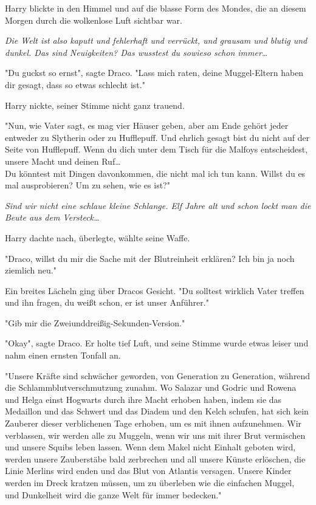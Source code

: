 {Harry blickte in den Himmel und auf die blasse Form des Mondes, die an diesem Morgen durch die wolkenlose Luft sichtbar war.

\emph{Die Welt ist also kaputt und fehlerhaft und verrückt, und grausam und blutig und dunkel. Das sind Neuigkeiten? Das wusstest du sowieso schon immer…}

"Du guckst so ernst", sagte Draco. "Lass mich raten, deine Muggel-Eltern haben dir gesagt, dass so etwas schlecht ist."

Harry nickte, seiner Stimme nicht ganz trauend.

"Nun, wie Vater sagt, es mag vier Häuser geben, aber am Ende gehört jeder entweder zu Slytherin oder zu Hufflepuff. Und ehrlich gesagt bist du nicht auf der Seite von Hufflepuff. Wenn du dich unter dem Tisch für die Malfoys entscheidest, unsere Macht und deinen Ruf…\\ Du könntest mit Dingen davonkommen, die nicht mal ich tun kann. Willst du es mal ausprobieren? Um zu sehen, wie es ist?"

\emph{Sind wir nicht eine schlaue kleine Schlange. Elf Jahre alt und schon lockt man die Beute aus dem Versteck…}

Harry dachte nach, überlegte, wählte seine Waffe.

"Draco, willst du mir die Sache mit der Blutreinheit erklären? Ich bin ja noch ziemlich neu."

Ein breites Lächeln ging über Dracos Gesicht. "Du solltest wirklich Vater treffen und ihn fragen, du weißt schon, er ist unser Anführer."

"Gib mir die Zweiunddreißig-Sekunden-Version."

"Okay", sagte Draco. Er holte tief Luft, und seine Stimme wurde etwas leiser und nahm einen ernsten Tonfall an.

"Unsere Kräfte sind schwächer geworden, von Generation zu Generation, während die Schlammblutverschmutzung zunahm. Wo Salazar und Godric und Rowena und Helga einst Hogwarts durch ihre Macht erhoben haben, indem sie das Medaillon und das Schwert und das Diadem und den Kelch schufen, hat sich kein Zauberer dieser verblichenen Tage erhoben, um es mit ihnen aufzunehmen. Wir verblassen, wir werden alle zu Muggeln, wenn wir uns mit ihrer Brut vermischen und unsere Squibs leben lassen. Wenn dem Makel nicht Einhalt geboten wird, werden unsere Zauberstäbe bald zerbrechen und all unsere Künste erlöschen, die Linie Merlins wird enden und das Blut von Atlantis versagen. Unsere Kinder werden im Dreck kratzen müssen, um zu überleben wie die einfachen Muggel, und Dunkelheit wird die ganze Welt für immer bedecken."

}

